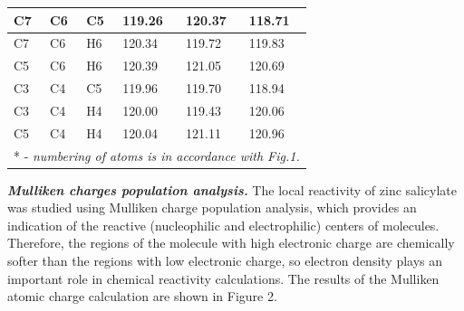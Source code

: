 \begin{table}[H]
\begin{tabular}{|l|l|l|lll|}
C7 & C6 & C5 & \multicolumn{1}{l|}{119.26} & \multicolumn{1}{l|}{120.37} & 118.71 \\ \hline
C7 & C6 & H6 & \multicolumn{1}{l|}{120.34} & \multicolumn{1}{l|}{119.72} & 119.83 \\ \hline
C5 & C6 & H6 & \multicolumn{1}{l|}{120.39} & \multicolumn{1}{l|}{121.05} & 120.69 \\ \hline
C3 & C4 & C5 & \multicolumn{1}{l|}{119.96} & \multicolumn{1}{l|}{119.70} & 118.94 \\ \hline
C3 & C4 & H4 & \multicolumn{1}{l|}{120.00} & \multicolumn{1}{l|}{119.43} & 120.06 \\ \hline
C5 & C4 & H4 & \multicolumn{1}{l|}{120.04} & \multicolumn{1}{l|}{121.11} & 120.96 \\ \hline
\multicolumn{6}{|l|}{* - \emph{numbering of atoms is in accordance with Fig.1.}} \\ \hline
\end{tabular}
\end{table}

\begin{multicols}{2}
\emph{{\bfseries Mulliken charges population analysis.}} The local
reactivity of zinc salicylate was studied using Mulliken charge
population analysis, which provides an indication of the reactive
(nucleophilic and electrophilic) centers of molecules. Therefore, the
regions of the molecule with high electronic charge are chemically
softer than the regions with low electronic charge, so electron density
plays an important role in chemical reactivity calculations. The results
of the Mulliken atomic charge calculation are shown in Figure 2.
\end{multicols}

